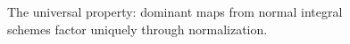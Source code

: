 \begin{figure}[htbp]\centering
{}
\caption{The universal property: dominant maps from normal integral schemes factor uniquely through normalization.}\label{fig:vi28-universal}\end{figure}
